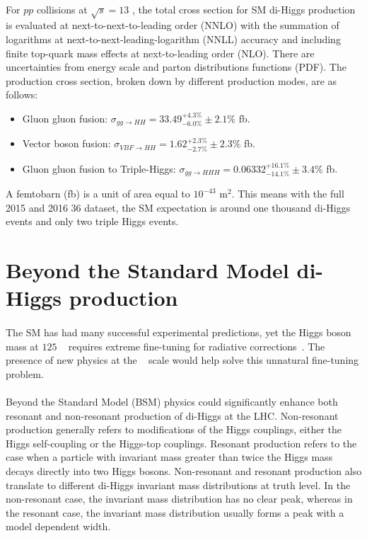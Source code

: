 \paragraph{}
\label{par:diHiggs-crosssection}
For $pp$ collisions at $\sqrt{s}=13$ \TeV, the total cross section for SM di-Higgs production~\cite{LHCYellow} is evaluated at next-to-next-to-leading order (NNLO) with the summation of logarithms at next-to-next-leading-logarithm (NNLL) accuracy and including finite top-quark mass effects at next-to-leading order (NLO).
There are uncertainties from energy scale and parton distributions functions (PDF). 
The production cross section, broken down by different production modes, are as follows:
\begin{itemize}
  \item Gluon gluon fusion: $\sigma_{gg \to HH} = 33.49^{+ 4.3 \%}_{-6.0 \%} \pm 2.1\%$ fb. %
  \item Vector boson fusion: $\sigma_{VBF \to HH} = 1.62^{+ 2.3 \%}_{-2.7 \%} \pm 2.3\%$ fb.
  \item Gluon gluon fusion to Triple-Higgs: $\sigma_{gg \to HHH} = 0.06332 ^{+ 16.1 \%}_{-14.1 \%} \pm 3.4\% $ fb.
\end{itemize}
A femtobarn (fb) is a unit of area equal to $10^{-43}$ m$^2$.
This means with the full 2015 and 2016 36 \ifb dataset, the SM expectation is around one thousand di-Higgs events and only two triple Higgs events.



\section{Beyond the Standard Model di-Higgs production}
\paragraph{}
The SM has had many successful experimental predictions, yet the Higgs boson mass at $125$ \GeV~ requires extreme fine-tuning for radiative corrections~\cite{Pdg}. 
The presence of new physics at the \TeV~ scale would help solve this unnatural fine-tuning problem.

\paragraph{}
Beyond the Standard Model (BSM) physics could significantly enhance both resonant and non-resonant production of di-Higgs at the LHC.
Non-resonant production generally refers to modifications of the Higgs couplings, either the Higgs self-coupling or the Higgs-top couplings. 
Resonant production refers to the case when a particle with invariant mass greater than twice the Higgs mass decays directly into two Higgs bosons. 
Non-resonant and resonant production also translate to different di-Higgs invariant mass distributions at truth level.
In the non-resonant case, the invariant mass distribution has no clear peak, whereas in the resonant case, the invariant mass distribution usually forms a peak with a model dependent width. 

